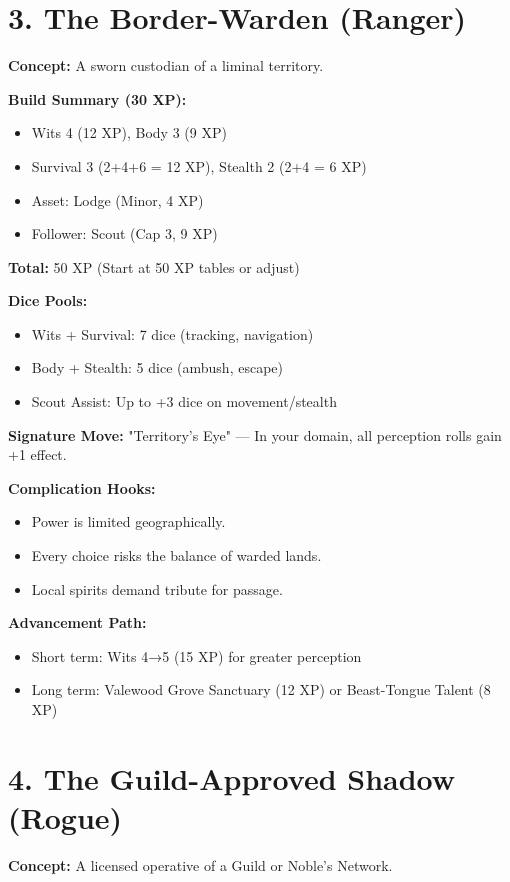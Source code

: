 \begin{itemize}
\section{3. The Border-Warden (Ranger)}

\textbf{Concept:} A sworn custodian of a liminal territory.

\textbf{Build Summary (30 XP):}
\begin{itemize}
  \item Wits 4 (12 XP), Body 3 (9 XP)
  \item Survival 3 (2+4+6 = 12 XP), Stealth 2 (2+4 = 6 XP)
  \item Asset: Lodge (Minor, 4 XP)
  \item Follower: Scout (Cap 3, 9 XP)
\end{itemize}
\textbf{Total:} 50 XP (Start at 50 XP tables or adjust)

\textbf{Dice Pools:}
\begin{itemize}
  \item Wits + Survival: 7 dice (tracking, navigation)
  \item Body + Stealth: 5 dice (ambush, escape)
  \item Scout Assist: Up to +3 dice on movement/stealth
\end{itemize}

\textbf{Signature Move:} "Territory's Eye" — In your domain, all perception rolls gain +1 effect.

\textbf{Complication Hooks:}
\begin{itemize}
  \item Power is limited geographically.
  \item Every choice risks the balance of warded lands.
  \item Local spirits demand tribute for passage.
\end{itemize}

\textbf{Advancement Path:}
\begin{itemize}
  \item Short term: Wits 4→5 (15 XP) for greater perception
  \item Long term: Valewood Grove Sanctuary (12 XP) or Beast-Tongue Talent (8 XP)
\end{itemize}

\section{4. The Guild-Approved Shadow (Rogue)}

\textbf{Concept:} A licensed operative of a Guild or Noble's Network.


\end{itemize}
